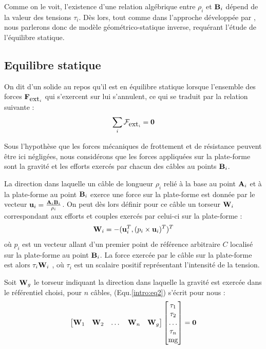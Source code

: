 Comme on le voit, l'existence d'une relation alg\'ebrique entre $\rho_i$ et 
${\bf B}_i$ d\'epend de la valeur des tensions $\tau_i$. Dès lors, tout comme 
dans l'approche développée par \cite{2010:Carricato.Merlet}, nous parlerons donc 
de modèle géométrico-statique inverse, requérant l'étude de l'équilibre 
statique.

\subsection{Equilibre statique} \label{chap0-1-2}

On dit d'un solide au repos qu'il est en équilibre statique lorsque l'ensemble 
des forces $\mathcal {\bf F}_{\hbox{ext}_i}$ qui s'exercent sur lui 
s'annulent, ce qui se traduit par la relation suivante :
\begin{equation}
\sum_i \boldmath {\mathcal F}_{\hbox{ext}_i} = {\bf 0}
\label{intro:eq2}
\end{equation}

Sous l'hypothèse que les forces mécaniques de frottement et de résistance 
peuvent être ici négligées, nous considérons que les forces appliqu\'ees sur la 
plate-forme sont la gravit\'e et les efforts exercés par chacun des câbles au 
points ${\bf B}_i$.

La direction dans laquelle un câble de longueur $\rho_i$ relié à la base au 
point ${\bf A}_i$ et à la plate-forme au point ${\bf B}_i$ exerce une force sur 
la plate-forme est donnée par le vecteur ${\bf u}_i = \frac{{\bf A}_i{\bf 
B}_i}{\rho_i}$. On peut dès lors définir pour ce câble un torseur ${\bf W}_i$ 
correspondant aux efforts et couples exercés par celui-ci sur la plate-forme :
\begin{equation}
{\bf W}_i = -({\bf u}_i^T, (p_i \times {\bf u}_i)^T)^T
\label{intro:eq3}
\end{equation}
où $p_i$ est un vecteur allant d'un premier point de référence arbitraire 
$C$ localisé sur la plate-forme au point ${\bf B}_i$. La force exercée par le 
câble sur la plate-forme est alors $ \tau_i {\bf W}_i$ , où $\tau_i$ est un 
scalaire positif représentant l'intensité de la tension.

Soit ${\bf W}_g$ le torseur indiquant la direction dans laquelle la gravité est 
exercée dans le référentiel choisi, pour $n$ câbles, (Equ.\ref{intro:eq2}) 
s'écrit pour nous :
\begin{equation}
\begin{bmatrix}
 {\bf W}_1 & {\bf W}_2 & \dots & {\bf W}_n & {\bf W}_g
\end{bmatrix}
\begin{bmatrix}
 \tau_1 \\ \tau_2 \\ \dots \\ \tau_n \\ \hbox{mg}
\end{bmatrix}
= {\bf 0}
\label{intro:eq4}
\end{equation}

